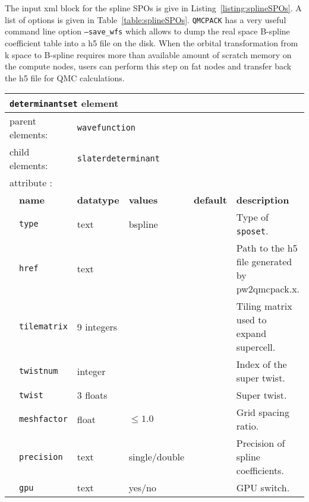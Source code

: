 The input xml block for the spline SPOs is give in Listing~\ref{listing:splineSPOs}. A list of options is given in 
Table~\ref{table:splineSPOs}. \texttt{QMCPACK} has a very useful command line option \texttt{--save\_wfs} which allows to dump 
the real space B-spline coefficient table into a h5 file on the disk.
When the orbital transformation from k space to B-spline requires more than available amount of scratch memory on the compute nodes, 
users can perform this step on fat nodes and transfer back the h5 file for QMC calculations.

\begin{table}[h]
\begin{center}
\begin{tabularx}{\textwidth}{l l l l l l }
\hline
\multicolumn{6}{l}{\texttt{determinantset} element} \\
\hline
\multicolumn{2}{l}{parent elements:} & \multicolumn{4}{l}{\texttt{wavefunction}}\\
\multicolumn{2}{l}{child  elements:} & \multicolumn{4}{l}{\texttt{slaterdeterminant}}\\
\multicolumn{2}{l}{attribute      :} & \multicolumn{4}{l}{}\\
   &   \bfseries name              & \bfseries datatype & \bfseries values & \bfseries default   & \bfseries description \\
   &   \texttt{type}                    &  text               &   bspline   &               &  Type of \texttt{sposet}. \\
   &   \texttt{href}                    &  text               &             &               &  Path to the h5 file generated by pw2qmcpack.x. \\
   &   \texttt{tilematrix}              &  9 integers         &             &               &  Tiling matrix used to expand supercell. \\
   &   \texttt{twistnum}                &  integer            &             &               &  Index of the super twist. \\
   &   \texttt{twist}                   &  3 floats         &             &               &  Super twist. \\
   &   \texttt{meshfactor}              &  float              &  $\le 1.0$      &               &  Grid spacing ratio. \\
   &   \texttt{precision}               &  text               &  single/double  &               &  Precision of spline coefficients. \\
   &   \texttt{gpu}                    &  text               &  yes/no      &               &  GPU switch. \\

\end{tabularx}
\end{center}
\end{table}
